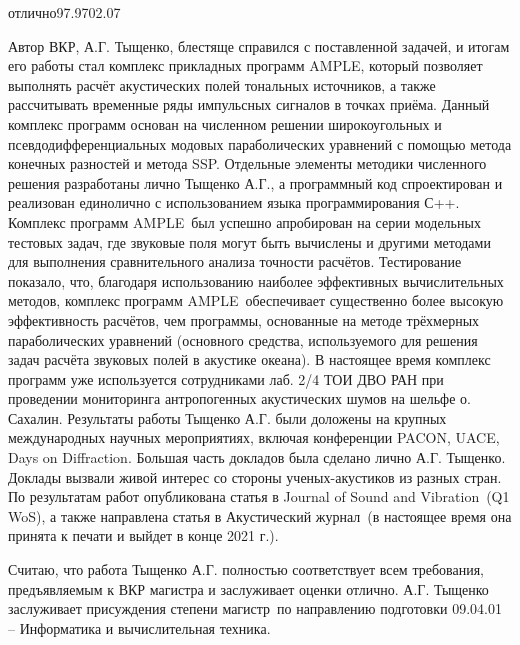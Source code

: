 \documentclass[../document.tex]{subfiles}
\begin{document}
\begin{supervisorreview}{отлично}{97.97}{02.07}
        \par Автор ВКР, А.Г. Тыщенко, блестяще справился с поставленной задачей, и итогам его работы стал комплекс прикладных программ \guillemotleft AMPLE\guillemotright, который позволяет выполнять расчёт акустических полей тональных источников, а также рассчитывать временные ряды импульсных сигналов в точках приёма. Данный комплекс программ основан на численном решении широкоугольных и псевдодифференциальных модовых параболических уравнений с помощью метода конечных разностей и метода SSP. Отдельные элементы методики численного решения разработаны лично Тыщенко А.Г., а программный код спроектирован и реализован единолично с использованием языка программирования С++. Комплекс программ \guillemotleft AMPLE\guillemotright\ был успешно апробирован на серии модельных тестовых задач, где звуковые поля могут быть вычислены и другими методами для выполнения сравнительного анализа точности расчётов. Тестирование показало, что, благодаря использованию наиболее эффективных вычислительных методов, комплекс программ \guillemotleft AMPLE\guillemotright\ обеспечивает существенно более высокую эффективность расчётов, чем программы, основанные на методе трёхмерных параболических уравнений (основного средства, используемого для решения задач расчёта звуковых полей в акустике океана). В настоящее время комплекс программ уже используется сотрудниками лаб. 2/4 ТОИ ДВО РАН при проведении мониторинга антропогенных акустических шумов на шельфе о. Сахалин. 
        Результаты работы Тыщенко А.Г. были доложены на крупных международных научных мероприятиях, включая конференции PACON, UACE, Days on Diffraction. Большая часть докладов была сделано лично А.Г. Тыщенко. Доклады вызвали живой интерес со стороны ученых-акустиков из разных стран. По результатам работ опубликована статья в \guillemotleft Journal of Sound and Vibration\guillemotright\ (Q1 WoS), а также направлена статья в \guillemotleft Акустический журнал\guillemotright\ (в настоящее время она принята к печати и выйдет в конце 2021 г.).
        \par Считаю, что работа Тыщенко А.Г. полностью соответствует всем требования, предъявляемым к ВКР магистра и заслуживает оценки \guillemotleft отлично\guillemotright. А.Г. Тыщенко заслуживает присуждения степени \guillemotleft магистр\guillemotright\ по направлению подготовки 09.04.01 -- \guillemotleft Информатика и вычислительная техника\guillemotright.
    \end{supervisorreview}
\end{document}
